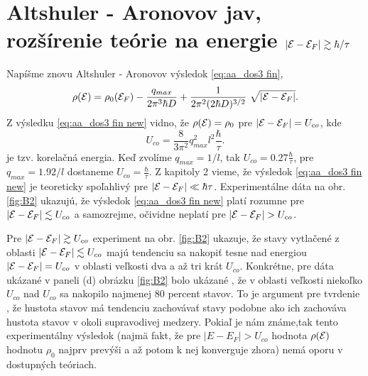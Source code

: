 \section{Altshuler - Aronovov jav, rozšírenie teórie na energie $|\mathcal{E} - \mathcal{E}_F| \gtrsim \hbar/\tau$}

Napíšme znovu Altshuler - Aronovov výsledok \eqref{eq:aa_dos3 fin},
\begin{equation}
 \label{eq:aa_dos3 fin new}
 \rho(\E)=\rho_0(\E_F) - \frac{q_{max}}{2\pi^3 \hbar D}
 +    \frac{1}{2\pi^2 (2\hbar D)^{3/2}}  \ \sqrt{|\E-\E_F|}  \text{.}
\end{equation}
Z výsledku \eqref{eq:aa_dos3 fin new} vidno, že $\rho(\mathcal{E}) = \rho_0$ pre $|\mathcal{E}-\mathcal{E}_F| =  U_{co}$,
kde
\begin{equation}
\label{eq:aa_U co korelenergia}
 U_{co} = \frac{8}{3\pi^{2}} q_{max}^2 l^2 \frac{\hbar}{\tau} \text{.}
\end{equation}
je tzv. korelačná energia. Keď zvolíme  $q_{max} =  1/l$, tak
$U_{co} = 0.27 \frac{\hbar}{\tau}$, pre $q_{max} =  1.92/l$ dostaneme $U_{co} = \frac{\hbar}{\tau}$. Z kapitoly 2 vieme, že
výsledok  \eqref{eq:aa_dos3 fin new} je teoreticky spoľahlivý pre $|\mathcal{E}-\mathcal{E}_F| \ll  {\hbar}{\tau}$. Experimentálne dáta na obr. \ref{fig:B2}
ukazujú, že výsledok  \eqref{eq:aa_dos3 fin new} platí rozumne pre  $|\mathcal{E}-\mathcal{E}_F| \lesssim  U_{co}$ a samozrejme, očividne neplatí pre $|\mathcal{E}-\mathcal{E}_F| > U_{co}$.

Pre $|\mathcal{E}-\mathcal{E}_F| \gtrsim  U_{co}$ experiment
na obr. \ref{fig:B2} ukazuje, že stavy vytlačené z oblasti $|\mathcal{E}-\mathcal{E}_F| \lesssim  U_{co}$ majú tendenciu sa nakopiť tesne
nad energiou $|\mathcal{E}-\mathcal{E}_F| =  U_{co}$ v oblasti veľkosti dva a až tri krát $U_{co}$.  Konkrétne, pre dáta ukázané v paneli (d) obrázku \ref{fig:B2} bolo ukázané \cite{Mazur}, že
v oblasti veľkosti niekoľko $U_{co}$ nad $U_{co}$ sa nakopilo najmenej $80$ percent stavov. To je argument pre tvrdenie \cite{Mazur}, že hustota stavov má tendenciu zachovávať stavy
podobne ako ich zachováva hustota stavov v okoli supravodivej medzery. Pokiaľ je nám známe,tak tento experimentálny výsledok (najmä fakt, že  pre $|E-E_F| > U_{co}$ hodnota $\rho(\mathcal{E})$ hodnotu $\rho_0$
najprv prevýši a až potom k nej konverguje zhora) nemá oporu v dostupných teóriach.

